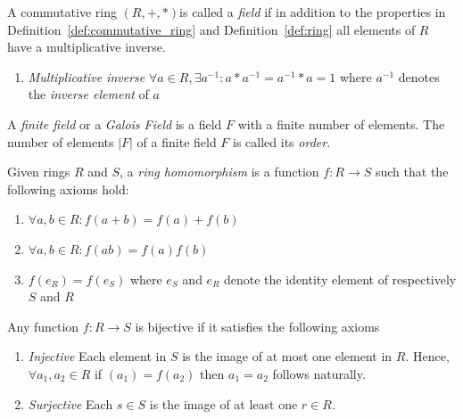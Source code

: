 \begin{defn}[Field]
\label{def:field}
 A commutative ring $\left( R, +, * \right)$is called a \textit{field} if in addition to the properties in Definition~\ref{def:commutative_ring} and Definition~\ref{def:ring} all elements of $R$ have a multiplicative inverse.
 \begin{enumerate}
  \setcounter{enumi}{\theenumTemp}
   \item \textit{Multiplicative inverse} $\forall a \in R, \exists a^{-1}: a*a^{-1} = a^{-1}*a = 1$ where $a^{-1}$ denotes the \textit{inverse element} of $a$
 \end{enumerate}
\end{defn}

\begin{defn}
\label{def:finite_field}
 A \textit{finite field} or a \textit{Galois Field} is a field $F$ with a finite number of elements. The number of elements $|F|$ of a finite field $F$ is called its \textit{order}.
\end{defn}

\begin{defn}
\label{def:ring_homomorphism}
 Given rings $R$ and $S$, a \textit{ring homomorphism} is a function $f: R \rightarrow S$ such that the following axioms hold:
 \begin{enumerate}
  \item $\forall a, b \in R: f \left( a + b \right) = f \left( a \right) + f \left( b \right)$
  \item $\forall a, b \in R: f \left( ab \right) = f \left( a \right) f \left( b \right)$
  \item $f \left( e_R \right) = f \left( e_S \right)$ where $e_S$ and $e_R$ denote the identity element of respectively $S$ and $R$
 \end{enumerate}
\end{defn}

\begin{defn}
\label{def:bijective_function} 
 Any function $f: R \rightarrow S$ is bijective if it satisfies the following axioms
 \begin{enumerate}
  \item \textit{Injective} Each element in $S$ is the image of at most one element in $R$. Hence, $\forall a_1, a_2 \in R$ if $\left( a_1 \right) = f \left( a_2 \right)$ then $a_1 = a_2$ follows naturally.
  \item \textit{Surjective} Each $s \in S$ is the image of at least one $r \in R$.
 \end{enumerate}
\end{defn}

